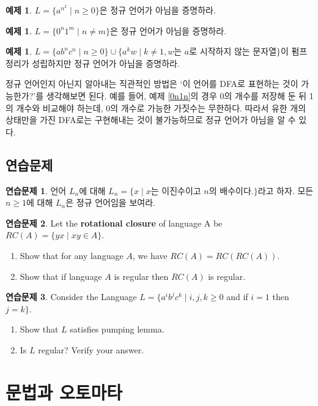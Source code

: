 \documentclass[b5paper, 11pt]{book}
\theoremstyle{definition}
\newtheorem{ex}[defn]{예제}
\newtheorem{ec}{연습문제}[chapter]
\begin{document}
\begin{ex}
    $L = \{a^{n^2} \;\vert\; n \ge 0\}$은 정규 언어가 아님을 증명하라.
\end{ex}
\begin{ex}
     $L = \{0^n 1^m \;\vert\; n \neq m\}$은 정규 언어가 아님을 증명하라.
\end{ex}
\begin{ex} 
    $L = \{ab^nc^n \;\vert\; n \ge 0\} \cup \{ a^k w \;\vert\; k \neq 1, w\text{는 } a\text{로 시작하지 않는 문자열} \}$이 펌프 정리가 성립하지만 정규 언어가 아님을 증명하라.
\end{ex}
정규 언어인지 아닌지 알아내는 직관적인 방법은 `이 언어를 DFA로 표현하는 것이 가능한가?'를
생각해보면 된다. 예를 들어, 예제 \ref{0n1n}의 경우 0의 개수를 저장해 둔 뒤 1의 개수와 비교해야 하는데,
0의 개수로 가능한 가짓수는 무한하다. 따라서 유한 개의 상태만을 가진 DFA로는 구현해내는 것이
불가능하므로 정규 언어가 아님을 알 수 있다. 

\section{연습문제}
\begin{ec}
    언어 $L_n$에 대해 
    $L_n = \{x \;\vert\; x$는 이진수이고 $n$의 배수이다.$\}$라고 하자. 
    모든 $n\ge 1$에 대해 $L_n$은 정규 언어임을 보여라. 
\end{ec}
\begin{ec}
    Let the \textbf{rotational closure} of language A be $RC(A) = \{yx\;\vert\; xy \in A\}$.
    \begin{enumerate}
        \item Show that for any language $A$, we have $RC(A) = RC(RC(A))$.
        \item Show that if language $A$ is regular then $RC(A)$ is regular.
    \end{enumerate}
\end{ec}
\begin{ec}
    Consider the Language $L= \{a^i b^j c^k \;\vert\; i, j, k \ge 0$ 
    and if $i = 1$ then $j=k\}$.
    \begin{enumerate}
        \item Show that $L$ satisfies pumping lemma.
        \item Is $L$ regular? Verify your answer.
    \end{enumerate}
\end{ec}
\chapter{문법과 오토마타} 
\end{document}

